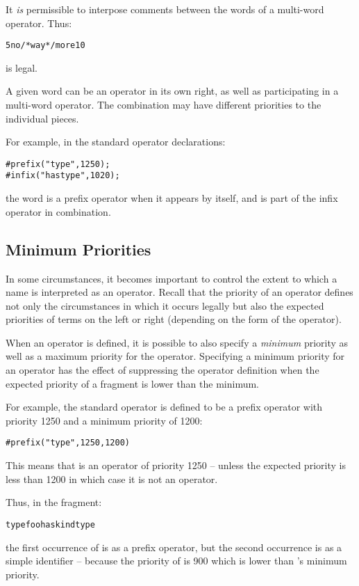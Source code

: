 \begin{aside}
It \emph{is} permissible to interpose comments between the words of a multi-word operator. Thus:
\begin{alltt}
5 no /* way */ more 10
\end{alltt}
is legal.
\end{aside}

\begin{aside}
A given word can be an operator in its own right, as well as participating in a multi-word operator. The combination may have different priorities to the individual pieces.

For example, in the standard operator declarations:
\begin{alltt}
#prefix("type",1250);
#infix("has type",1020);
\end{alltt}
the word  is a prefix operator when it appears by itself, and is part of the infix operator  in combination.
\end{aside}

\subsection{Minimum Priorities}
In some circumstances, it becomes important to control the extent to which a name is interpreted as an operator. Recall that the priority of an operator defines not only the circumstances in which it occurs legally but also the expected priorities of terms on the left or right (depending on the form of the operator).

When an operator is defined, it is possible to also specify a \emph{minimum} priority as well as a maximum priority for the operator. Specifying a minimum priority for an operator has the effect of suppressing the operator definition when the expected priority of a fragment is lower than the minimum.

For example, the  standard operator is defined to be a prefix operator with priority 1250 and a minimum priority of 1200:
\begin{alltt}
\#prefix("type",1250,1200)
\end{alltt}
This means that  is an operator of priority 1250 -- unless the expected priority is less than 1200 in which case it is not an operator.

Thus, in the fragment:
\begin{alltt}
type foo has kind type
\end{alltt}
the first occurrence of  is as a prefix operator, but the second occurrence is as a simple identifier -- because the priority of  is 900 which is lower than 's minimum priority.

